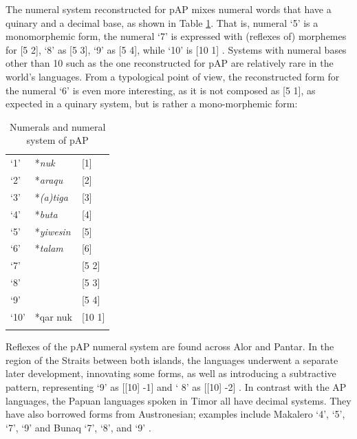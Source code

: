 The numeral system reconstructed for pAP mixes numeral words that have a quinary and a decimal base, as shown in Table \ref{tab:1:11}. That is, numeral `5' is a monomorphemic form, the numeral `7' is expressed with (reflexes of) morphemes for [5 2], `8' as [5 3], `9' as [5 4], while `10' is [10 1] \citep{SchapperEtAlTVnumeralsystems}. Systems with numeral bases other than 10 such as the one reconstructed for pAP are relatively rare in the world's languages. From a typological point of view, the reconstructed form for the numeral `6' is even more interesting, as it is not composed as [5 1], as expected in a quinary system, but is rather a mono-morphemic form:
 


\begin{table}
\begin{tabular}{lll}      
\mytoprule
`1' & *\textit{nuk}  &  [1] \\
`2' & *\textit{araqu}   &  [2] \\
`3' & *\textit{(a)tiga}  &  [3] \\
`4' & *\textit{buta}  &  [4] \\
`5' & *\textit{yiwesin}  &  [5]  \\
`6' & *\textit{talam}  &  [6] \\
`7' &  &  [5 2] \\
`8' &  &  [5 3] \\
`9' &  &  [5 4] \\
`10' & *qar nuk  & [10 1] \\
\mybottomrule
\end{tabular}
\caption{Numerals and numeral system of pAP \citep{SchapperEtAlTVnumeralsystems}}
\label{tab:1:11}
\end{table}

Reflexes of the pAP numeral system are found across Alor and Pantar.  In the region of the Straits between both islands, the languages underwent a separate later development, innovating some forms, as well as introducing a subtractive pattern, representing `9' as [[10] -1] and ` 8' as [[10] -2] \citep{SchapperEtAlTVnumeralsystems}. In contrast with the AP languages, the Papuan languages spoken in Timor all have decimal systems. They have also borrowed forms from Austronesian; examples include Makalero `4', `5', `7', `9' \citep{Huber2011} and Bunaq `7', `8', and `9' \citep{Schapper2009}. 

